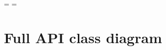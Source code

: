 \documentclass{projdoc}
\begin{document}
\makeatletter%
\newbox\full@class@diag%
\newlength\full@class@diag@width%
\newlength\full@class@diag@height%
\savebox{}%
\settowidth\full@class@diag@width{\usebox\full@class@diag}%
\settoheight\full@class@diag@height{\usebox\full@class@diag}%
\begingroup%
\eject%
\thispagestyle{empty}%
\pdfpagewidth=\full@class@diag@width%
\pdfpageheight=\full@class@diag@height%
\AddToShipoutPictureBG*{%
  \AtPageUpperLeft{%
		\raisebox{-\full@class@diag@height}{%
			\usebox\full@class@diag%
		}%
	}%
}%
\section{Full API class diagram}%
\newpage%
\endgroup%
\makeatother%
\end{document}
